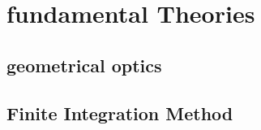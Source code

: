 \chapter{fundamental Theories}

\section{geometrical optics}



\section{Finite Integration Method}


